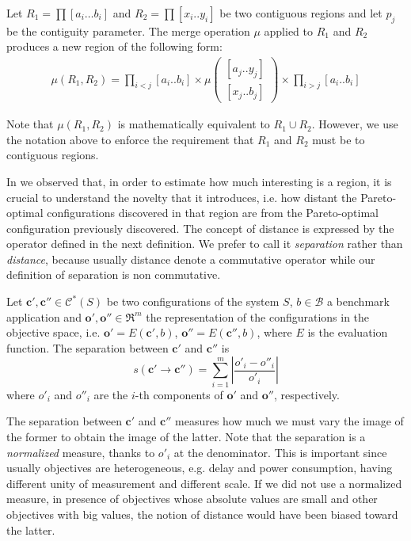 \begin{definition}
Let $R_{1}=\prod\left[a_{i}\dots b_{i}\right]$ and $R_{2}=\prod\left[x_{i}..y_{i}\right]$ be two contiguous regions and let $p_j$ be the contiguity parameter. 
The merge operation $\mu$ applied to $R_1$ and $R_2$ produces a new region of the following form:
	\begin{align}
		\mu(R_1,R_2)=\prod_{i<j}\left[a_{i}..b_{i}\right]
		\times
		\mu	 \left( \begin{array}{l}
				\left[a_{j}..y_{j}\right] \\
				\left[x_{j}..b_{j}\right]
		     \end{array} \right)
		\times
		\prod_{i>j}\left[a_{i}..b_{i}\right]
	\end{align}
\end{definition}

Note that $\mu(R_{1},R_{2})$ is mathematically equivalent to $R_{1}\cup R_{2}$. However, we use the notation above to enforce the requirement that
$R_{1}$ and $R_{2}$ must be to contiguous regions.

In  we observed that, in order to estimate how much interesting is a region, it is crucial to understand the novelty that it introduces, i.e. how distant the Pareto-optimal configurations discovered in that region are from the Pareto-optimal configuration previously discovered. The concept of distance is expressed by the operator defined in the next definition. We prefer to call it \emph{separation} rather than \emph{distance}, because usually distance denote a commutative operator while our definition of separation is non commutative.

\begin{definition}[Separation]
Let $\mathbf{c}',\mathbf{c}''\in \mathcal{C}^*(S)$ be two configurations of the system $S$, $b\in\mathcal{B}$ a benchmark application and $\mathbf{o}',\mathbf{o}''\in \Re^m$ the representation of the configurations in the objective space, i.e. $\mathbf{o}'=E \left(\mathbf{c}', b\right)$, $\mathbf{o}''=E \left(\mathbf{c}'', b\right)$, where $E$ is the evaluation function. The separation between
$\mathbf{c}'$ and $\mathbf{c}''$ is 
	\[
	s\left(\mathbf{c}'\rightarrow\mathbf{c}''\right)=\sum_{i=1}^{m}\left|\frac{o'_{i}-o''_{i}}{o'_{i}}\right|
	\]
where $o'_i$ and $o''_i$ are the $i$-th components of $\mathbf{o}'$ and $\mathbf{o}''$, respectively.
\end{definition}

The separation between $\mathbf{c}'$ and $\mathbf{c}''$ measures how
much we must vary the image of the former to obtain the image of the latter. Note that the separation is a \emph{normalized} measure, thanks to $o'_i$ at the denominator. This is important since usually objectives are heterogeneous, e.g. delay and power consumption, having different unity of measurement and different scale. If we did not use a normalized measure, in presence of objectives whose absolute values are small and other objectives with big values, the notion of distance would have been biased toward the latter.
